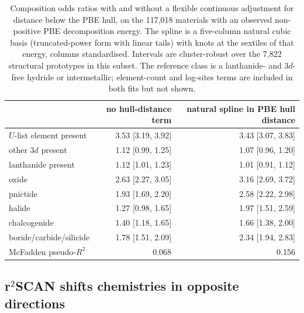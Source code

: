 \documentclass[11pt]{article}
\begin{document}
\begin{table}[htbp]\centering
\caption{Composition odds ratios with and without a flexible continuous adjustment for
distance below the PBE hull, on the 117{,}018 materials with an observed non-positive PBE
decomposition energy. The spline is a five-column natural cubic basis (truncated-power form with linear
tails) with knots at the sextiles of that energy, columns standardised. Intervals are cluster-robust over the 7{,}822
structural prototypes in this subset. The
reference class is a lanthanide- and 3$d$-free hydride or intermetallic; element-count
and log-sites terms are included in both fits but not shown.}
\label{tab:hullcont}
\small\begin{tabular}{lrr}
\toprule
 & no hull-distance term & natural spline in PBE hull distance \\
\midrule
$U$-list element present   & 3.53 [3.19, 3.92] & 3.43 [3.07, 3.83] \\
other 3$d$ present         & 1.12 [0.99, 1.25] & 1.07 [0.96, 1.20] \\
lanthanide present         & 1.12 [1.01, 1.23] & 1.01 [0.91, 1.12] \\
oxide                      & 2.63 [2.27, 3.05] & 3.16 [2.69, 3.72] \\
pnictide                   & 1.93 [1.69, 2.20] & 2.58 [2.22, 2.98] \\
halide                     & 1.27 [0.98, 1.65] & 1.97 [1.51, 2.59] \\
chalcogenide               & 1.40 [1.18, 1.65] & 1.66 [1.38, 2.00] \\
boride/carbide/silicide    & 1.78 [1.51, 2.09] & 2.34 [1.94, 2.83] \\
\midrule
McFadden pseudo-$R^2$      & 0.068 & 0.156 \\
\bottomrule
\end{tabular}
\end{table}

\subsection{\texorpdfstring{r$^2$SCAN}{r2SCAN} shifts chemistries in opposite directions}\label{sec:shift}
\end{document}
